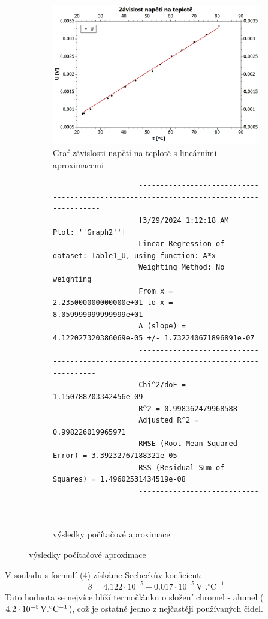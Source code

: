 \documentclass[czech,11pt,a4paper]{article}
\begin{document}
		\begin{figure}[H]
		
		\begin{subfigure}{0.5\textwidth}
			\includegraphics[width=1\linewidth, ]{napeti} 
			\caption{Graf závislosti napětí na teplotě s lineárními aproximacemi}
			\label{fig:subim1}
		\end{subfigure}
		\begin{subfigure}{0.4\textwidth}
			{\tiny \begin{verbatim}
					---------------------------------------------------------------------------------------
					[3/29/2024 1:12:18 AM	Plot: ''Graph2'']
					Linear Regression of dataset: Table1_U, using function: A*x
					Weighting Method: No weighting
					From x = 2.235000000000000e+01 to x = 8.059999999999999e+01
					A (slope) = 4.122027320386069e-05 +/- 1.732240671896891e-07
					--------------------------------------------------------------------------------------
					Chi^2/doF = 1.150788703342456e-09
					R^2 = 0.998362479968588
					Adjusted R^2 = 0.998226019965971
					RMSE (Root Mean Squared Error) = 3.39232767188321e-05
					RSS (Residual Sum of Squares) = 1.49602531434519e-08
					---------------------------------------------------------------------------------------
			\end{verbatim}}
			\caption{výsledky počítačové aproximace}
		\end{subfigure}
	\end{figure}
	
	V souladu s formulí (4) získáme Seebeckův koeficient:
	\begin{equation}
		\beta = 4.122 \cdot 10^{-5} \pm 0.017 \cdot 10^{-5} \, \text{V }. ^\circ \text{C}^{-1}
	\end{equation}
	Tato hodnota se nejvíce blíží termočlánku o složení chromel - alumel ($ 4.2 \cdot 10 ^{-5} \,\rm V . ^\circ C ^{-1}$), což je ostatně jedno z nejčastěji používaných čidel.\\
\end{document}
